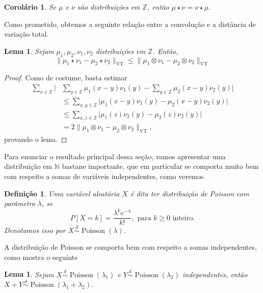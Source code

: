 \documentclass[reqno, final]{book}
\newcommand*\1{\mathds{1}}
\newtheorem{corollary}[theorem]{Corolário}
\newtheorem{lemma}[theorem]{Lema}
\newtheorem{definition}[theorem]{Definição}
\DeclareMathOperator{\Poisson}{Poisson}
\DeclareMathOperator{\VT}{VT}
\begin{document}
\begin{corollary}
Se $\mu$ e $\nu$ são distribuições em $\mathbb{Z}$, então $\mu \star \nu = \nu \star \mu$.
\end{corollary}

Como prometido, obtemos a seguinte relação entre a convolução e a distância de  variação total.
\begin{lemma}
\label{l:vt_conv}
Sejam $\mu_1, \mu_2, \nu_1, \nu_2$ distribuições em $\mathbb{Z}$. Então,
\begin{equation}
  \lVert \mu_1 \star \nu_1 - \mu_2 \star \nu_2 \rVert_{\VT} \leq \lVert \mu_1 \otimes \nu_1 - \mu_2 \otimes \nu_2 \rVert_{\VT}
\end{equation}
\end{lemma}

\begin{proof}
Como de costume, basta estimar
\begin{equation}
  \begin{split}
    \sum_{x \in \mathbb{Z}} \Big| & \sum_{y \in \mathbb{Z}} \mu_1(x-y) \nu_1(y) - \sum_{y \in \mathbb{Z}} \mu_2(x-y)\nu_2(y) \Big|\\
    & \leq \sum_{x, y \in \mathbb{Z}} \big| \mu_1(x-y) \nu_1(y) - \mu_2(x-y)\nu_2(y) \big|\\
    & \leq \sum_{x, z \in \mathbb{Z}} \big| \mu_1(z) \nu_2(y) - \mu_2(z)\nu_2(y) \big|\\
    & = 2\lVert \mu_1 \otimes \nu_1 - \mu_2 \otimes \nu_2 \rVert_{\VT},
  \end{split}
\end{equation}
provando o lema.
\end{proof}

Para enunciar o resultado principal dessa seção, vamos apresentar uma distribuição em $\mathbb{N}$ bastane importante, que em particular se comporta muito bem com respeito a somas de variáveis independentes, como veremos.

\begin{definition}
  Uma variável aleatória $X$ é dita ter distribuição de Poisson  com parâmetro $\lambda$, se
  \begin{equation}
    P[X = k] = \frac{\lambda^k e^{-\lambda}}{k!}, \text{ para $k \geq 0$ inteiro.}
  \end{equation}
  Denotamos isso por $X \overset{d}\sim \Poisson(\lambda)$.
\end{definition}

A distribuição de Poisson se comporta bem com respeito a somas independentes, como mostra o seguinte
\begin{lemma}
\label{l:soma_poisson}
Sejam $X \overset{d}\sim \Poisson(\lambda_1)$ e $Y \overset{d}\sim \Poisson(\lambda_2)$ independentes, então $X+Y \overset{d}\sim \Poisson(\lambda_1 + \lambda_2)$.
\end{lemma}
\end{document}
